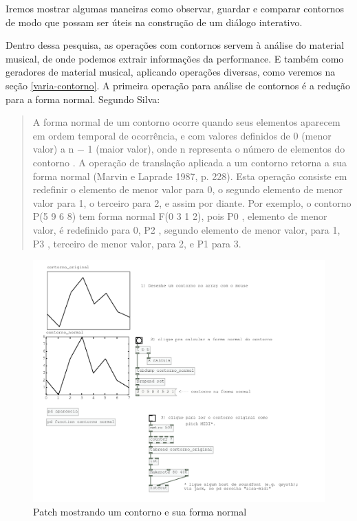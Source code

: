 \documentclass{ppgmus}
\begin{document}
Iremos mostrar algumas maneiras como observar, guardar e comparar contornos de modo
que possam ser úteis na construção de um diálogo interativo.

Dentro dessa pesquisa, as operações com contornos servem à análise do material musical,
de onde podemos extrair informações da performance. E também como geradores de material
musical, aplicando operações diversas, como veremos na seção \ref{varia-contorno}.
A primeira operação para análise de contornos é a redução para a forma normal. Segundo Silva:

\begin{quote}
 A forma normal de um contorno ocorre quando seus elementos aparecem em ordem
temporal de ocorrência, e com valores definidos de 0 (menor valor) a n − 1 (maior valor),
onde n  representa o número de elementos do contorno . A operação de translação aplicada a um
contorno retorna a sua forma normal (Marvin e Laprade 1987, p. 228). Esta operação
consiste em redefinir o elemento de menor valor para 0, o segundo elemento de menor
valor para 1, o terceiro para 2, e assim por diante. Por exemplo, o contorno P(5 9 6 8)
tem forma normal F(0 3 1 2), pois P0 , elemento de menor valor, é redefinido para 0, P2 ,
segundo elemento de menor valor, para 1, P3 , terceiro de menor valor, para 2, e P1 para
3.
\end{quote}


\begin{figure}
\includegraphics[scale=.2]{contorno-normal}
\caption{Patch mostrando um contorno e sua forma normal}
\label{contorno-normal}
\end{figure}
\end{document}
